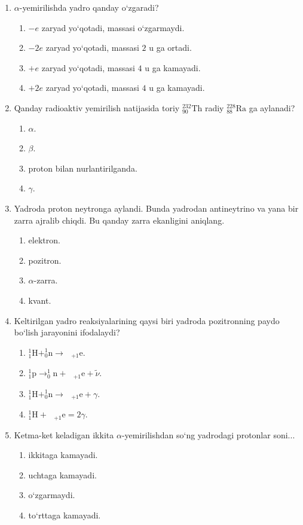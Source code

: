 \begin{enumerate}
\item $\alpha$-yemirilishda yadro qanday o‘zgaradi?
\begin{enumerate}[label=\Alph*)]
\item $-e$ zaryad yo‘qotadi, massasi o‘zgarmaydi.
\item $-2e$ zaryad yo‘qotadi, massasi $2\text{ u}$ ga ortadi.
\item $+e$ zaryad yo‘qotadi, massasi $4\text{ u}$ ga kamayadi.
\item $+2e$ zaryad yo‘qotadi, massasi $4\text{ u}$ ga kamayadi.
\end{enumerate}

\item Qanday radioaktiv yemirilish natijasida toriy $^{232}_{90}\text{Th}$ radiy $^{228}_{88}\text{Ra}$ ga aylanadi?
\begin{enumerate}[label=\Alph*)]
\item $\alpha$.
\item $\beta$.
\item proton bilan nurlantirilganda.
\item $\gamma$.
\end{enumerate}

\item Yadroda proton neytronga aylandi. Bunda yadrodan antineytrino va yana bir zarra ajralib chiqdi. Bu qanday zarra ekanligini aniqlang.
\begin{enumerate}[label=\Alph*)]
\item elektron.
\item pozitron.
\item $\alpha$-zarra.
\item kvant.
\end{enumerate}

\item Keltirilgan yadro reaksiyalarining qaysi biri yadroda pozitronning paydo bo‘lish jarayonini ifodalaydi?
\begin{enumerate}[label=\Alph*)]
\item $^1_1\text{H} + ^1_0\text{n} \rightarrow \text{ }_{+1}\text{e}$.
\item $^1_1\text{p} \rightarrow ^1_0\text{n} + \text{ }_{+1}\text{e} + \tilde{\nu}$.
\item $^1_1\text{H} + ^1_0\text{n} \rightarrow \text{ }_{+1}\text{e} + \gamma$.
\item $^1_1\text{H} + \text{ }_{+1}\text{e} = 2\gamma$.
\end{enumerate}

\item Ketma-ket keladigan ikkita $\alpha$-yemirilishdan so‘ng yadrodagi protonlar soni...
\begin{enumerate}[label=\Alph*)]
\item ikkitaga kamayadi.
\item uchtaga kamayadi.
\item o‘zgarmaydi.
\item to‘rttaga kamayadi.
\end{enumerate}


\end{enumerate}
